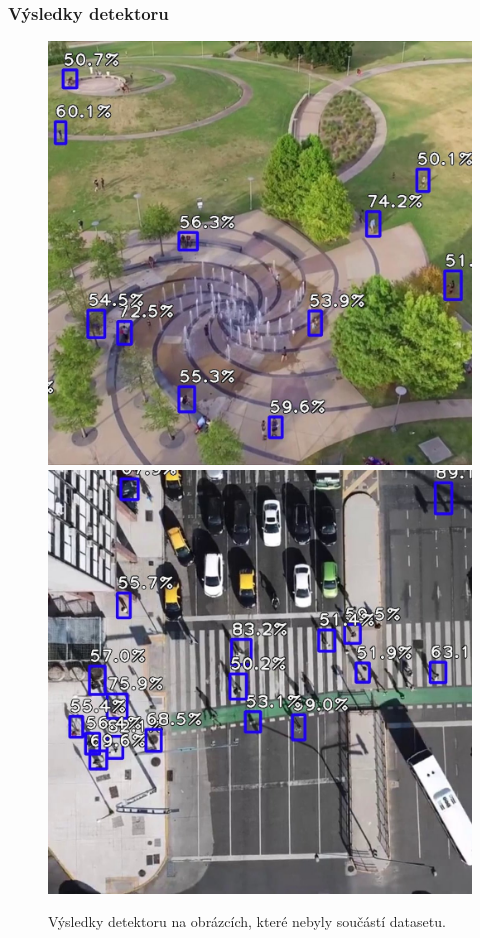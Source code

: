 \documentclass[11pt,xcolor=pdflatex]{beamer}
\begin{document}
    


\begin{frame}\frametitle{Výsledky detektoru}
    
     \begin{figure}[H]
        \centering
        \includegraphics[width=.49\linewidth]{images/t3-t2.jpg}
        \includegraphics[width=.49\linewidth]{images/t3-t3.jpg}
        \caption{Výsledky detektoru na obrázcích, které nebyly součástí datasetu.}
    \end{figure}
    
\end{frame}


    
\end{document}
